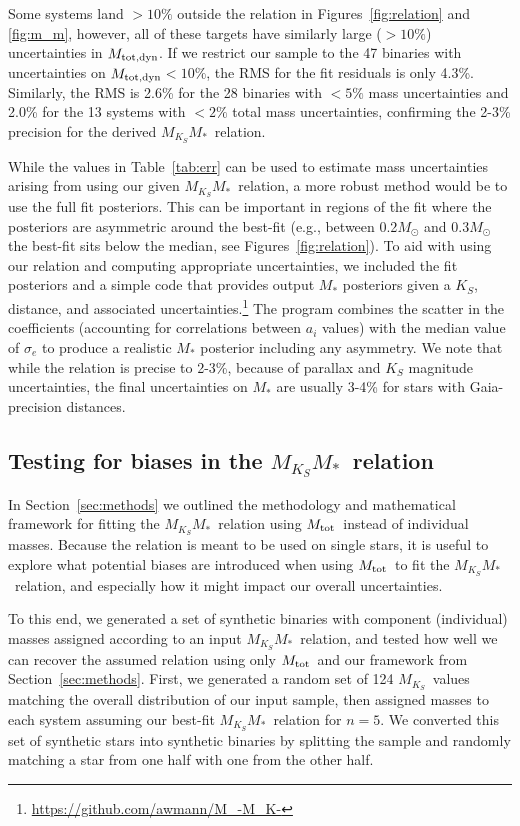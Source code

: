 \documentclass[twocolumn]{aastex62}
\newcommand{\mks}{$M_{K_S}$}
\newcommand{\mmk}{$M_{K_S}$\textendash$M_*$}
\newcommand{\order}{5}
\newcommand{\mtot}{$M_{\rm{tot}}$}
\newcommand{\mdyn}{$M_{\rm{tot,dyn}}$}
\begin{document}
Some systems land $>10\%$ outside the relation in Figures~\ref{fig:relation} and \ref{fig:m_m}, however, all of these targets have similarly large ($>10\%$) uncertainties in \mdyn. If we restrict our sample to the 47 binaries with uncertainties on \mdyn$<10\%$, the RMS for the fit residuals is only 4.3\%. Similarly, the RMS is 2.6\% for the 28 binaries with $<5\%$ mass uncertainties and 2.0\% for the 13 systems with $<2\%$ total mass uncertainties, confirming the 2-3\% precision for the derived \mmk\ relation. 

While the values in Table~\ref{tab:err} can be used to estimate mass uncertainties arising from using our given \mmk\ relation, a more robust method would be to use the full fit posteriors. This can be important in regions of the fit where the posteriors are asymmetric around the best-fit (e.g., between 0.2$M_\odot$  and 0.3$M_\odot$ the best-fit sits below the median, see Figures~\ref{fig:relation}). To aid with using our relation and computing appropriate uncertainties, we included the fit posteriors and a simple code that provides output $M_*$ posteriors given a $K_S$, distance, and associated uncertainties.\footnote{\href{https://github.com/awmann/M_-M_K-}{https://github.com/awmann/M\_-M\_K-}} The program combines the scatter in the coefficients (accounting for correlations between $a_i$ values) with the median value of $\sigma_e$ to produce a realistic $M_*$ posterior including any asymmetry. We note that while the relation is precise to 2-3\%, because of parallax and $K_S$ magnitude uncertainties, the final uncertainties on $M_*$ are usually 3-4\% for stars with Gaia-precision distances. 


\subsection{Testing for biases in the \mmk\ relation}\label{sec:totalvsind}
In Section~\ref{sec:methods} we outlined the methodology and mathematical framework for fitting the \mmk\ relation using \mtot\ instead of individual masses. Because the relation is meant to be used on single stars, it is useful to explore what potential biases are introduced when using \mtot\ to fit the \mmk\ relation, and especially how it might impact our overall uncertainties. 

To this end, we generated a set of synthetic binaries with component (individual) masses assigned according to an input \mmk\ relation, and tested how well we can recover the assumed relation using only \mtot\ and our framework from Section~\ref{sec:methods}. First, we generated a random set of 124 \mks\ values matching the overall distribution of our input sample, then assigned masses to each system assuming our best-fit \mmk\ relation for $n=\order$.  We converted this set of synthetic stars into synthetic binaries by splitting the sample and randomly matching a star from one half with one from the other half. 
\end{document}
